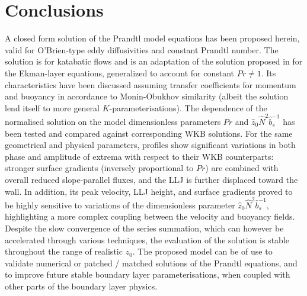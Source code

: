 

\section{Conclusions}
%
A closed form solution of the Prandtl model equations has been proposed herein, valid for O'Brien-type eddy diffusivities and constant Prandtl number. 
The solution is for katabatic flows and is an adaptation of the solution proposed in \citet{Nieuwstadt1983a} for the Ekman-layer equations, generalized to account for constant $Pr \neq 1$.
Its characteristics have been discussed assuming transfer coefficients for momentum and buoyancy in accordance to Monin-Obukhov similarity (albeit the solution lend itself to more general $K$-parameterisations). 
The dependence of the normalised solution on the model dimensionless parameters $Pr$ and $\hat{z}_0 \hat{N}^2 \hat{b}_s^{-1}$ has been tested and compared against corresponding WKB solutions. 
For the same geometrical and physical parameters, profiles show significant variations in both phase and amplitude of extrema with respect to their WKB counterparts: stronger surface gradients (inversely proportional to $Pr$) are combined with overall reduced slope-parallel fluxes, and the LLJ is further displaced toward the wall.
In addition, its peak velocity, LLJ height, and surface gradients proved to be highly sensitive to variations of the dimensionless parameter $\hat{z}_0 \hat{N}^2 \hat{b}_s^{-1}$, highlighting a more complex coupling between the velocity and buoyancy fields.
Despite the slow convergence of the series summation, which can however be accelerated through various techniques, the evaluation of the solution is stable throughout the range of realistic $z_0$.
The proposed model can be of use to validate numerical or patched / matched solutions of the Prandtl equations, and to improve future stable boundary layer parameterisations, when coupled with other parts of the boundary layer physics.


